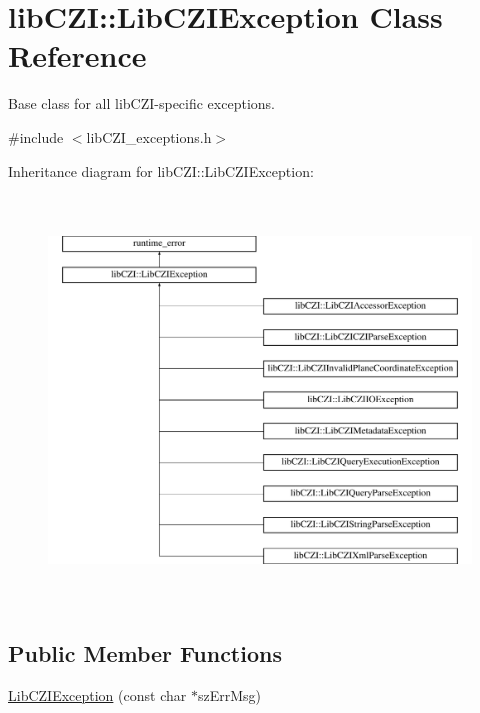 \hypertarget{classlib_c_z_i_1_1_lib_c_z_i_exception}{}\section{lib\+C\+ZI\+:\+:Lib\+C\+Z\+I\+Exception Class Reference}
\label{classlib_c_z_i_1_1_lib_c_z_i_exception}


Base class for all lib\+C\+Z\+I-\/specific exceptions.  




{\ttfamily \#include $<$lib\+C\+Z\+I\+\_\+exceptions.\+h$>$}

Inheritance diagram for lib\+C\+ZI\+:\+:Lib\+C\+Z\+I\+Exception\+:\begin{figure}[H]
\begin{center}
\leavevmode
\includegraphics[height=10.845070cm]{classlib_c_z_i_1_1_lib_c_z_i_exception}
\end{center}
\end{figure}
\subsection*{Public Member Functions}
\begin{DoxyCompactItemize}
\item 
\hyperlink{classlib_c_z_i_1_1_lib_c_z_i_exception_ab6a09f2d1b399b1aa37f2ea75b80d6f8}{Lib\+C\+Z\+I\+Exception} (const char $\ast$sz\+Err\+Msg)
\end{DoxyCompactItemize}


